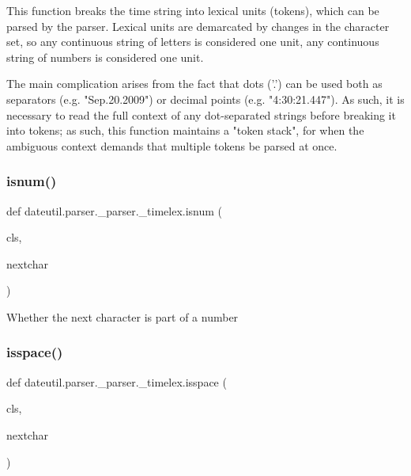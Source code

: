 \begin{DoxyVerb}This function breaks the time string into lexical units (tokens), which
can be parsed by the parser. Lexical units are demarcated by changes in
the character set, so any continuous string of letters is considered
one unit, any continuous string of numbers is considered one unit.

The main complication arises from the fact that dots ('.') can be used
both as separators (e.g. "Sep.20.2009") or decimal points (e.g.
"4:30:21.447"). As such, it is necessary to read the full context of
any dot-separated strings before breaking it into tokens; as such, this
function maintains a "token stack", for when the ambiguous context
demands that multiple tokens be parsed at once.
\end{DoxyVerb}
 \mbox{\label{classdateutil_1_1parser_1_1__parser_1_1__timelex_a7cc667a2754b9718a07ba6b6b0c44fcb}} 
\subsubsection{\texorpdfstring{isnum()}{isnum()}}
{\footnotesize\ttfamily def dateutil.\+parser.\+\_\+parser.\+\_\+timelex.\+isnum (\begin{DoxyParamCaption}\item[{}]{cls,  }\item[{}]{nextchar }\end{DoxyParamCaption})}

\begin{DoxyVerb}Whether the next character is part of a number \end{DoxyVerb}
 \mbox{\label{classdateutil_1_1parser_1_1__parser_1_1__timelex_ad1f7dea7c868d4558cb2cf98e3703bc8}} 
\subsubsection{\texorpdfstring{isspace()}{isspace()}}
{\footnotesize\ttfamily def dateutil.\+parser.\+\_\+parser.\+\_\+timelex.\+isspace (\begin{DoxyParamCaption}\item[{}]{cls,  }\item[{}]{nextchar }\end{DoxyParamCaption})}

